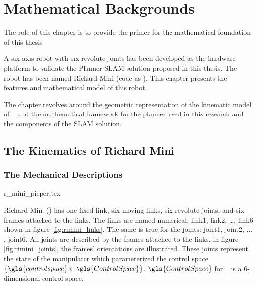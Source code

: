 

\chapter{Mathematical Backgrounds}\label{chap:mathematical_background}

\noindent
The role of this chapter is to provide the primer
for the mathematical foundation of this thesis. 

A six-axis robot with six revolute joints has been developed
as the hardware platform to validate the Planner-SLAM
solution proposed in this thesis. The robot has been
named Richard Mini (code as ). This chapter presents
the features and mathematical model of this robot.

The chapter revolves around the geometric 
representation of the kinematic model 
of \rimini~ and the mathematical 
framework for the planner used in this research
and the components of the SLAM solution. 

\section{The Kinematics of Richard Mini}\label{sec:kinematics_rimini}
\subsection{The Mechanical Descriptions}\label{sec:mechanical_description}

{r_mini_pieper.tex} %
 
Richard Mini (\rimini) has one fixed link, 
six moving links, six revolute joints, and 
six frames attached to the links. The links are named numerical:
link1, link2, \ldots, link6 shown in figure \ref{fig:rimini_links}.
The same is true for the joints: joint1,
joint2, $\ldots$, joint6. All joints are described by the frames
attached to the links. In figure \ref{fig:rimini_joints}, the frames' orientations
are illustrated. 
These joints represent the state of 
the manipulator which parameterized the control space $\{\gls{controlspace} \in \gls{ControlSpace}\}$. $ \gls{ControlSpace} $ for \rimini~ 
is a 6-dimensional control space.

